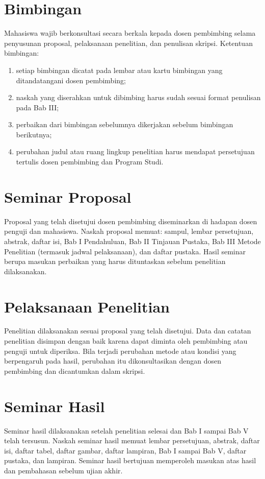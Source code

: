 \section{Bimbingan}
Mahasiswa wajib berkonsultasi secara berkala kepada dosen pembimbing selama penyusunan proposal, pelaksanaan penelitian, dan penulisan skripsi. Ketentuan bimbingan:
\begin{enumerate}
\item setiap bimbingan dicatat pada lembar atau kartu bimbingan yang ditandatangani dosen pembimbing;
\item naskah yang diserahkan untuk dibimbing harus sudah sesuai format penulisan pada Bab III;
\item perbaikan dari bimbingan sebelumnya dikerjakan sebelum bimbingan berikutnya;
\item perubahan judul atau ruang lingkup penelitian harus mendapat persetujuan tertulis dosen pembimbing dan Program Studi.
\end{enumerate}

\section{Seminar Proposal}
Proposal yang telah disetujui dosen pembimbing diseminarkan di hadapan dosen penguji dan mahasiswa. Naskah proposal memuat: sampul, lembar persetujuan, abstrak, daftar isi, Bab I Pendahuluan, Bab II Tinjauan Pustaka, Bab III Metode Penelitian (termasuk jadwal pelaksanaan), dan daftar pustaka. Hasil seminar berupa masukan perbaikan yang harus dituntaskan sebelum penelitian dilaksanakan.

\section{Pelaksanaan Penelitian}
Penelitian dilaksanakan sesuai proposal yang telah disetujui. Data dan catatan penelitian disimpan dengan baik karena dapat diminta oleh pembimbing atau penguji untuk diperiksa. Bila terjadi perubahan metode atau kondisi yang berpengaruh pada hasil, perubahan itu dikonsultasikan dengan dosen pembimbing dan dicantumkan dalam skripsi.

\section{Seminar Hasil}
Seminar hasil dilaksanakan setelah penelitian selesai dan Bab I sampai Bab V telah tersusun. Naskah seminar hasil memuat lembar persetujuan, abstrak, daftar isi, daftar tabel, daftar gambar, daftar lampiran, Bab I sampai Bab V, daftar pustaka, dan lampiran. Seminar hasil bertujuan memperoleh masukan atas hasil dan pembahasan sebelum ujian akhir.

